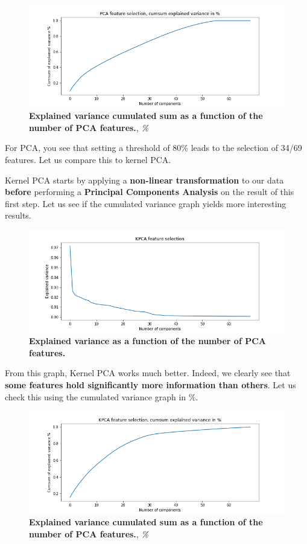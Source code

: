 \documentclass[12pt]{report}
\begin{document}
\begin{figure}[h!]
\centering
\includegraphics[scale=0.5]{PCA_feature_selection_cumsum_percent.png}
\caption{\textbf{Explained variance cumulated sum as a function of the number of PCA features.}, \textit{\%}}
\label{fig:pcavariancepercent}
\end{figure}

For PCA, you see that setting a threshold of 80\% leads to the selection of 34/69 features. Let us compare this to kernel PCA. 


Kernel PCA starts by applying a \textbf{non-linear transformation} to our data \textbf{before} performing a \textbf{Principal Components Analysis} on the result of this first step\citep{kernelpca}. Let us see if the cumulated variance graph yields more interesting results.\newline

\begin{figure}[h!]
\centering
\includegraphics[scale=0.5]{KPCA_feature_selection.png}
\caption{\textbf{Explained variance as a function of the number of PCA features.}}
\label{fig:kpcavariance}
\end{figure}
From this graph, Kernel PCA works much better. Indeed, we clearly see that \textbf{some features hold significantly more information than others}. Let us check this using the cumulated variance graph in \%. 
\begin{figure}[h!]
\centering
\includegraphics[scale=0.5]{KPCA_feature_selection_cumsum_percent.png}
\caption{\textbf{Explained variance cumulated sum as a function of the number of PCA features.}, \textit{\%}}
\label{fig:kpcavariancepercent}
\end{figure}
\end{document}
